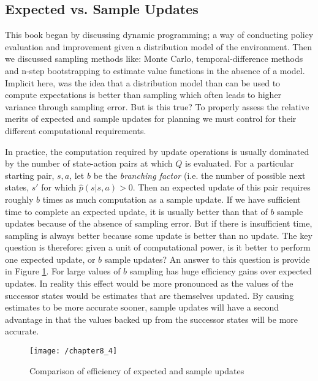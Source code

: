 \subsection{Expected vs. Sample Updates}
This book began by discussing dynamic programming; a way of conducting policy evaluation and improvement given a distribution model of the environment. Then we discussed sampling methods like: Monte Carlo, temporal-difference methods and n-step bootstrapping to estimate value functions in the absence of a model. Implicit here, was the idea that a distribution model than can be used to compute expectations is better than sampling which often leads to higher variance through sampling error. But is this true? To properly assess the relative merits of expected and sample updates for planning we must control for their different computational requirements.

In practice, the computation required by update operations is usually dominated by the number of state-action pairs at which $Q$ is evaluated. For a particular starting pair, $s, a$, let $b$ be the \textit{branching factor} (i.e. the number of possible next states, $s'$ for which $\hat{p}(s|s,a)>0$. Then an expected update of this pair requires roughly $b$ times as much computation as a sample update. If we have sufficient time to complete an expected update, it is usually better than that of $b$ sample updates because of the absence of sampling error. But if there is insufficient time, sampling is always better because some update is better than no update. The key question is therefore: given a unit of computational power, is it better to perform one expected update, or $b$ sample updates? An answer to this question is provide in Figure \ref{fig: samples vs expectations}. For large values of $b$ sampling has huge efficiency gains over expected updates. In reality this effect would be more pronounced as the values of the successor states would be estimates that are themselves updated. By causing estimates to be more accurate sooner, sample updates will have a second advantage in that the values backed up from the successor states will be more accurate.

\begin{figure}
	\centering
	\texttt{[image: /chapter8\_4]}
	\caption{Comparison of efficiency of expected and sample updates}
	\label{fig: samples vs expectations}
\end{figure}

